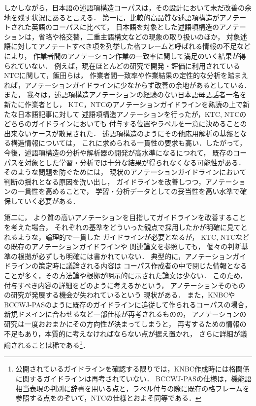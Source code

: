 \documentclass[japanese]{jnlp_1.4}
\begin{document}
しかしながら，日本語の述語項構造コーパスは，その設計において未だ改善の余地を残す状況にあると言える．
第一に，比較的高品質な述語項構造がアノテートされた英語のコーパスに比べて，
日本語を対象とした述語項構造のアノテーションは，省略や格交替，二重主語構文などの現象の取り扱いのほか，
対象述語に対してアノテートすべき項を列挙した格フレームと呼ばれる情報の不足などにより，
作業者間のアノテーション作業の一致率に関して満足のいく結果が得られていない．
例えば，現在ほとんどの研究で開発・評価に利用されているNTCに関して，飯田らは，
作業者間一致率や作業結果の定性的な分析を踏まえれば，アノテーションガイドラインに少なからず改善の余地があるとしている\cite{飯田龍2010述語項構造}．
また，
我々は，述語項構造アノテーションの経験のない日本語母語話者一名を新たに作業者とし，
KTC，NTCのアノテーションガイドラインを熟読の上で新たな日本語記事に対して
述語項構造アノテーションを行ったが，KTC, NTCのどちらのガイドラインにおいても
付与する位置やラベルを一意に決めることの出来ないケースが散見された．
述語項構造のようにその他応用解析の基盤となる構造情報については，
これに求められる一貫性の要求も高い．したがって，今後，述語項構造の分析や解析器の開発が高水準になるにつれて，
既存のコーパスを対象とした学習・分析では十分な結果が得られなくなる可能性がある．
そのような問題を防ぐためには，
現状のアノテーションガイドラインにおいて判断の揺れとなる原因を洗い出し，
ガイドラインを改善しつつ，アノテーションの一貫性を高めることで，
学習・分析データとしての妥当性を高い水準で確保していく必要がある．


第二に，
より質の高いアノテーションを目指してガイドラインを改善することを考えた場合，
それぞれの基準をどういった観点で採用したかが明確に見てとれるような，論理的で一貫した
ガイドラインが必要となるが，
KTC, NTCなどの既存のアノテーションガイドライン\cite{ntcguideline,ktcguideline}や
関連論文\cite{kawahara2002construction,河原大輔2002関係,iida2007annotating,飯田龍2010述語項構造}を参照しても，
個々の判断基準の根拠が必ずしも明確には書かれていない．
典型的に，アノテーションガイドラインの策定時に議論される内容は
コーパス作成者の中で閉じた情報となることが多く，その方法論や根拠が明示的に示された論文は少ない．
このため，付与すべき内容の詳細をどのように考えるかという，
アノテーションそのものの研究が発展する機会が失われているという
現状がある．
また，KNBCやBCCWJ-PASのように既存のガイドラインに追従して作られるコーパスの場合，
新規ドメインに合わせるなど一部仕様が再考されるものの，
アノテーションの研究は一度おおまかにその方向性が決まってしまうと，
再考するための情報の不足もあり，本質的に考えなければならない点が据え置かれ，
さらに詳細が議論されることは稀である\footnote{公開されているガイドラインを確認する限りでは，KNBC作成時には格関係に関するガイドラインは再考されていない．
BCCWJ-PASの仕様は，機能語相当表現の判別に辞書を用いる点と，ラベル付与の際に既存の格フレームを参照する点をのぞいて，NTCの仕様とおよそ同等である．}．
\end{document}
